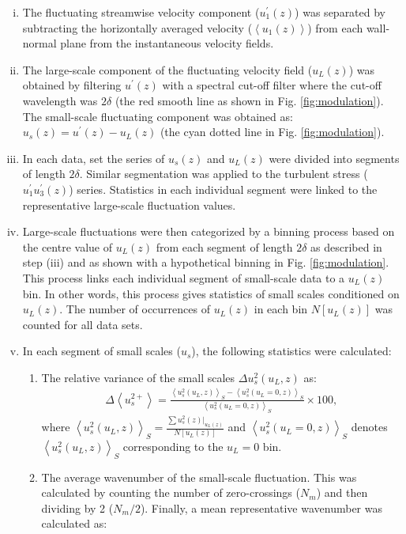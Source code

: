 \begin{enumerate}[(i)]
\item The fluctuating streamwise velocity component ($u_{1}^\prime(z)$) was separated by subtracting the horizontally averaged velocity ($\left< u_{1}(z)\right>$) from each wall-normal plane from the instantaneous velocity fields.
\item The large-scale component of the fluctuating velocity field ($u_L(z)$) was obtained by filtering $u^\prime(z)$ with a spectral cut-off filter where the cut-off wavelength was $2\delta$ (the red smooth line as shown in Fig. \ref{fig:modulation}). The small-scale fluctuating component was obtained as: $u_s(z)=u^\prime(z)-u_L(z)$ (the cyan dotted line in Fig. \ref{fig:modulation}).
\item In each data, set the series of $u_s(z)$ and $u_L(z)$ were divided into segments of length $2\delta$. Similar segmentation was applied to the turbulent stress ($u_{1}^\prime u_{3}^\prime(z)$) series. Statistics in each individual segment were linked to the representative large-scale fluctuation values. 
\item Large-scale fluctuations were then categorized by a binning process based on the centre value of $u_L(z)$ from each segment of length $2\delta$ as described in step (iii) and as shown with a hypothetical binning in Fig. \ref{fig:modulation}. This process links each individual segment of small-scale data to a $u_L(z)$ bin. In other words, this process gives statistics of small scales conditioned on $u_L(z)$. The number of occurrences of $u_L(z)$ in each bin $N[u_L(z)]$ was counted for all data sets.    
\item In each segment of small scales ($u_s$), the following statistics were calculated:
 \begin{enumerate}[(1)]
    \item The relative variance of the small scales $\Delta u_s^2(u_L,z)$ as: 
    \begin{align}
        \Delta \left < u_s^{2+}\right > =\frac{\left < u_s^2(u_L,z)\right >_S-\left < u_s^2(u_L=0,z)\right >_S}{\left < u_s^2(u_L=0,z)\right >_S} \times 100,
    \label{eq:relative_var_us2}    
    \end{align}
    where $\left < u_s^2(u_L,z) \right >_S = \frac{\sum u_s^2(z)|_{u_L(z)}}{N[u_L(z)]}$ and $\left < u_s^2(u_L=0,z)\right >_S$ denotes $\left < u_s^2(u_L,z) \right >_S$ corresponding to the $u_L=0$ bin.
    \item The average wavenumber of the small-scale fluctuation. This was calculated by counting the number of zero-crossings ($N_m$) and then dividing by 2 ($N_m/2$). Finally, a mean representative wavenumber was calculated as:

\end{enumerate}
\end{enumerate}
